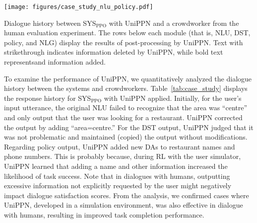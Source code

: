 \begin{table}[tbp]
\centering
\texttt{[image: figures/case\_study\_nlu\_policy.pdf]}
\caption{Dialogue history between SYS$_\text{PPO}$ with UniPPN and a crowdworker from the human evaluation experiment. The rows below each module (that is, NLU, DST, policy, and NLG) display the results of post-processing by UniPPN. Text with strikethrough indicates information deleted by UniPPN, while bold text representsand information added.}
\label{tab:case_study}
\end{table}

To examine the performance of UniPPN, we quantitatively analyzed the dialogue history between the systems and crowdworkers. Table~\ref{tab:case_study} displays the response history for SYS$_\text{PPO}$ with UniPPN applied. Initially, for the user's input utterance, the original NLU failed to recognize that the area was ``centre'' and only output that the user was looking for a restaurant. UniPPN corrected the output by adding ``area=centre.'' For the DST output, UniPPN judged that it was not problematic and maintained (copied) the output without modifications. Regarding policy output, UniPPN added new DAs to restaurant names and phone numbers. This is probably because, during RL with the user simulator, UniPPN learned that adding a name and other information increased the likelihood of task success. Note that in dialogues with humans, outputting excessive information not explicitly requested by the user might negatively impact dialogue satisfaction scores. From the analysis, we confirmed cases where UniPPN, developed in a simulation environment, was also effective in dialogue with humans, resulting in improved task completion performance.
